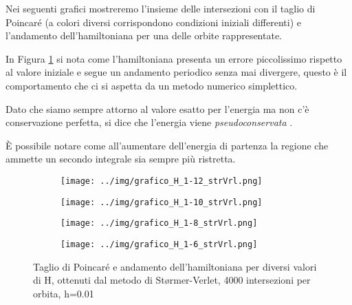 \documentclass[a4paper, 12pt]{article}
\numberwithin{equation}{section}
\numberwithin{figure}{section}
\begin{document}
Nei seguenti grafici mostreremo l'insieme delle intersezioni con il taglio di Poincaré (a colori
diversi corrispondono condizioni iniziali differenti) e l'andamento dell'hamiltoniana per una delle
orbite rappresentate.

In Figura \ref{img:stormerverlet} si nota come l'hamiltoniana presenta un errore piccolissimo rispetto
al valore iniziale e segue un andamento periodico senza mai divergere, questo è il comportamento che 
ci si aspetta da un metodo numerico simplettico.

Dato che siamo sempre attorno al valore esatto per l'energia ma non c'è conservazione perfetta, si dice che
l'energia viene \textit{pseudoconservata} .

È possibile notare come all'aumentare dell'energia di partenza la regione che ammette un secondo
integrale sia sempre più ristretta.
\begin{figure}[h!]
	\centering
	\begin{subfigure}[t]{.49\textwidth}
		\centering
		\texttt{[image: ../img/grafico\_H\_1-12\_strVrl.png]}
	\end{subfigure}
	\begin{subfigure}[t]{.49\textwidth}
		\centering
		\texttt{[image: ../img/grafico\_H\_1-10\_strVrl.png]}
	\end{subfigure}
	\begin{subfigure}[t]{.49\textwidth}
		\centering
		\texttt{[image: ../img/grafico\_H\_1-8\_strVrl.png]}
	\end{subfigure}
	\begin{subfigure}[t]{.49\textwidth}
		\centering
		\texttt{[image: ../img/grafico\_H\_1-6\_strVrl.png]}
	\end{subfigure}

	\caption{Taglio di Poincaré e andamento dell'hamiltoniana per diversi valori di H,
	ottenuti dal metodo di Størmer-Verlet, 4000 intersezioni per orbita, h=0.01}
	\label{img:stormerverlet}
\end{figure}
\end{document}

